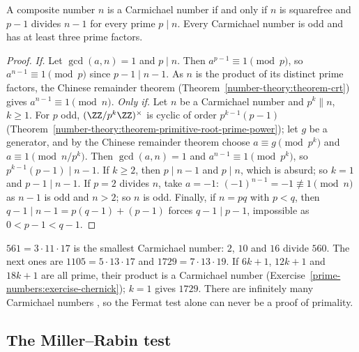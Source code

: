 \begin{theorem}\label{prime-numbers:theorem-korselt}
A composite number $n$ is a Carmichael number if and only if $n$ is squarefree and $p - 1$ divides $n - 1$ for every prime $p \mid n$. Every Carmichael number is odd and has at least three prime
factors.
\end{theorem}

\begin{proof}
\emph{If.} Let $\gcd(a, n) = 1$ and $p \mid n$. Then $a^{p-1} \equiv 1 \pmod p$, so $a^{n-1} \equiv 1 \pmod p$ since $p - 1 \mid n - 1$. As $n$ is the product of its distinct prime factors, the Chinese
remainder theorem (Theorem~\ref{number-theory:theorem-crt}) gives $a^{n-1} \equiv 1 \pmod n$.
\emph{Only if.} Let $n$ be a Carmichael number and $p^k \parallel n$, $k \geq 1$. For $p$ odd, $(\ZZ/p^k\ZZ)^\times$ is cyclic of order $p^{k-1}(p - 1)$
(Theorem~\ref{number-theory:theorem-primitive-root-prime-power}); let $g$ be a generator, and by the Chinese remainder theorem choose $a \equiv g \pmod{p^k}$ and $a \equiv 1 \pmod{n/p^k}$. Then
$\gcd(a, n) = 1$ and $a^{n-1} \equiv 1 \pmod{p^k}$, so $p^{k-1}(p - 1) \mid n - 1$. If $k \geq 2$, then $p \mid n - 1$ and $p \mid n$, which is absurd; so $k = 1$ and $p - 1 \mid n - 1$. If $p = 2$ divides
$n$, take $a = -1$: $(-1)^{n-1} = -1 \not\equiv 1 \pmod n$ as $n - 1$ is odd and $n > 2$; so $n$ is odd. Finally, if $n = pq$ with $p < q$, then $q - 1 \mid n - 1 = p(q - 1) + (p - 1)$ forces
$q - 1 \mid p - 1$, impossible as $0 < p - 1 < q - 1$.
\end{proof}

\begin{example}\label{prime-numbers:example-carmichael}
$561 = 3 \cdot 11 \cdot 17$ is the smallest Carmichael number: $2$, $10$ and $16$ divide $560$. The next ones are $1105 = 5 \cdot 13 \cdot 17$ and $1729 = 7 \cdot 13 \cdot 19$. If $6k + 1$, $12k + 1$ and
$18k + 1$ are all prime, their product is a Carmichael number (Exercise~\ref{prime-numbers:exercise-chernick}); $k = 1$ gives $1729$. There are infinitely many Carmichael numbers
\cite{alford-granville-pomerance}, so the Fermat test alone can never be a proof of primality.
\end{example}

\subsection{The Miller--Rabin test}\label{prime-numbers:subsection-miller-rabin}


